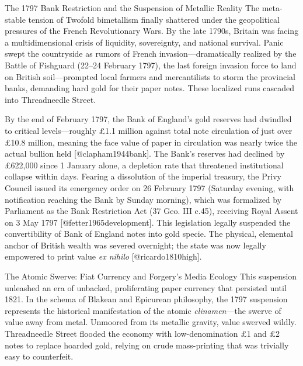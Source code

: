\documentclass[
  ignorenonframetext,
]{beamer}
\author{\texorpdfstring{}{}}
\date{}
\begin{document}
\begin{frame}{The 1797 Bank Restriction and the Suspension of Metallic
Reality}
\protect{}\label{sec-bank-restriction-1797}
The meta-stable tension of Twofold bimetallism finally shattered under
the geopolitical pressures of the French Revolutionary Wars. By the late
1790s, Britain was facing a multidimensional crisis of liquidity,
sovereignty, and national survival. Panic swept the countryside as
rumors of French invasion---dramatically realized by the Battle of
Fishguard (22--24 February 1797), the last foreign invasion force to
land on British soil---prompted local farmers and mercantilists to storm
the provincial banks, demanding hard gold for their paper notes. These
localized runs cascaded into Threadneedle Street.

By the end of February 1797, the Bank of England's gold reserves had
dwindled to critical levels---roughly £1.1 million against total note
circulation of just over £10.8 million, meaning the face value of paper
in circulation was nearly twice the actual bullion held
{[}@clapham1944bank{]}. The Bank's reserves had declined by £622,000
since 1 January alone, a depletion rate that threatened institutional
collapse within days. Fearing a dissolution of the imperial treasury,
the Privy Council issued its emergency order on 26 February 1797
(Saturday evening, with notification reaching the Bank by Sunday
morning), which was formalized by Parliament as the Bank Restriction Act
(37 Geo. III c.45), receiving Royal Assent on 3 May 1797
{[}@fetter1965development{]}. This legislation legally suspended the
convertibility of Bank of England notes into gold specie. The physical,
elemental anchor of British wealth was severed overnight; the state was
now legally empowered to print value \emph{ex nihilo}
{[}@ricardo1810high{]}.

\begin{block}{The Atomic Swerve: Fiat Currency and Forgery's Media
Ecology}
\protect{}\label{the-atomic-swerve-fiat-currency-and-forgerys-media-ecology}
This suspension unleashed an era of unbacked, proliferating paper
currency that persisted until 1821. In the schema of Blakean and
Epicurean philosophy, the 1797 suspension represents the historical
manifestation of the atomic \emph{clinamen}---the swerve of value away
from metal. Unmoored from its metallic gravity, value swerved wildly.
Threadneedle Street flooded the economy with low-denomination £1 and £2
notes to replace hoarded gold, relying on crude mass-printing that was
trivially easy to counterfeit.


\end{block}
\end{frame}
\end{document}
